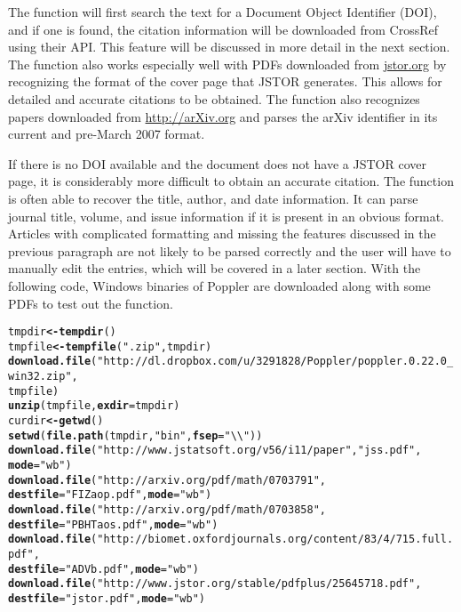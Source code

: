 \documentclass[article]{jss}\usepackage[]{graphicx}\usepackage[]{color}
\makeatletter
\newcommand{\hlstr}[1]{\textcolor[rgb]{0.125,0.125,1}{#1}}%
\newcommand{\hlstd}[1]{\textcolor[rgb]{0.251,0.251,0.282}{#1}}%
\newcommand{\hlkwb}[1]{\textcolor[rgb]{0.439,0.251,1}{\textbf{#1}}}%
\newcommand{\hlkwc}[1]{\textcolor[rgb]{0.529,0,0.184}{\textbf{#1}}}%
\newcommand{\hlkwd}[1]{\textcolor[rgb]{0.251,0.251,0.282}{\textbf{#1}}}%
\newenvironment{kframe}{%
 \def\at@end@of@kframe{}%
 \ifinner\ifhmode%
  \def\at@end@of@kframe{\end{minipage}}%
  \begin{minipage}{\columnwidth}%
 \fi\fi%
 \def\FrameCommand##1{\hskip\@totalleftmargin \hskip-\fboxsep
 \colorbox{shadecolor}{##1}\hskip-\fboxsep
     \hskip-\linewidth \hskip-\@totalleftmargin \hskip\columnwidth}%
 \MakeFramed {\advance\hsize-\width
   \@totalleftmargin\z@ \linewidth\hsize
   \@setminipage}}%
 {\par\unskip\endMakeFramed%
 \at@end@of@kframe}
\newenvironment{knitrout}{}{} %
\makeatother
\begin{document}
The function will first search the text for a Document Object Identifier (DOI), and if one is found, the citation information will be downloaded from CrossRef using their API.  This feature will be discussed in more detail in the next section.  The function also works especially well with PDFs downloaded from \url{jstor.org} by recognizing the format of the cover page that JSTOR generates.  This allows for detailed and accurate citations to be obtained.  The function also recognizes papers downloaded from \url{http://arXiv.org} and parses the arXiv identifier in its current and pre-March 2007 format.

If there is no DOI available and the document does not have a JSTOR cover page, it is considerably more difficult to obtain an accurate citation.  The function is often able to recover the title, author, and date information.  It can parse journal title, volume, and issue information if it is present in an obvious format.  Articles with complicated formatting and missing the features discussed in the previous paragraph are not likely to be parsed correctly and the user will have to manually edit the entries, which will be covered in a later section.
With the following code, Windows binaries of Poppler are downloaded along with some PDFs
to test out the function.
\begin{knitrout}
\color{fgcolor}\begin{kframe}
\begin{alltt}
\hlstd{tmpdir} \hlkwb{<-} \hlkwd{tempdir}\hlstd{()}
\hlstd{tmpfile} \hlkwb{<-} \hlkwd{tempfile}\hlstd{(}\hlstr{".zip"}\hlstd{, tmpdir)}
\hlkwd{download.file}\hlstd{(}\hlstr{"http://dl.dropbox.com/u/3291828/Poppler/poppler.0.22.0_win32.zip"}\hlstd{,}
              \hlstd{tmpfile)}
\hlkwd{unzip}\hlstd{(tmpfile,} \hlkwc{exdir} \hlstd{= tmpdir)}
\hlstd{curdir} \hlkwb{<-} \hlkwd{getwd}\hlstd{()}
\hlkwd{setwd}\hlstd{(}\hlkwd{file.path}\hlstd{(tmpdir,} \hlstr{"bin"}\hlstd{,} \hlkwc{fsep} \hlstd{=} \hlstr{"\textbackslash{}\textbackslash{}"}\hlstd{))}
\hlkwd{download.file}\hlstd{(}\hlstr{"http://www.jstatsoft.org/v56/i11/paper"}\hlstd{,} \hlstr{"jss.pdf"}\hlstd{,}
                \hlkwc{mode} \hlstd{=} \hlstr{"wb"}\hlstd{)}
\hlkwd{download.file}\hlstd{(}\hlstr{"http://arxiv.org/pdf/math/0703791"}\hlstd{,}
              \hlkwc{destfile} \hlstd{=} \hlstr{"FIZaop.pdf"}\hlstd{,} \hlkwc{mode} \hlstd{=} \hlstr{"wb"}\hlstd{)}
\hlkwd{download.file}\hlstd{(}\hlstr{"http://arxiv.org/pdf/math/0703858"}\hlstd{,}
              \hlkwc{destfile} \hlstd{=} \hlstr{"PBHTaos.pdf"}\hlstd{,} \hlkwc{mode} \hlstd{=} \hlstr{"wb"}\hlstd{)}
\hlkwd{download.file}\hlstd{(}\hlstr{"http://biomet.oxfordjournals.org/content/83/4/715.full.pdf"}\hlstd{,}
  \hlkwc{destfile} \hlstd{=} \hlstr{"ADVb.pdf"}\hlstd{,} \hlkwc{mode} \hlstd{=} \hlstr{"wb"}\hlstd{)}
\hlkwd{download.file}\hlstd{(}\hlstr{"http://www.jstor.org/stable/pdfplus/25645718.pdf"}\hlstd{,}
              \hlkwc{destfile} \hlstd{=} \hlstr{"jstor.pdf"}\hlstd{,} \hlkwc{mode} \hlstd{=} \hlstr{"wb"}\hlstd{)}
\end{alltt}
\end{kframe}
\end{knitrout}
\end{document}
